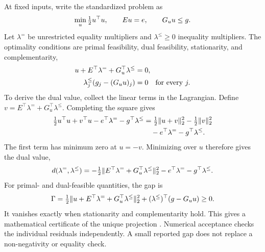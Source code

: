 At fixed inputs, write the standardized problem as
\begin{equation}
\equationname{Standardized quadratic projection with equalities and inequalities}
\min_u\tfrac12u^\top u,\qquad Eu=e,\qquad G_uu\le g.
\label{eq:plant_standard_projection}
\end{equation}
Let $\lambda^=$ be unrestricted equality multipliers and $\lambda^\le\ge0$ inequality multipliers. The optimality conditions are primal feasibility, dual feasibility, stationarity, and complementarity,
\begin{align}
\equationname{Stationarity condition for the plant quadratic projection}
u+E^\top\lambda^=+G_u^\top\lambda^\le&=0,\\
\equationname{Complementarity condition for the projection inequality multipliers}
\lambda^\le_j(g_j-(G_uu)_j)&=0\quad\text{for every }j.
\label{eq:plant_projection_optimality}
\end{align}
To derive the dual value, collect the linear terms in the Lagrangian. Define $v=E^\top\lambda^=+G_u^\top\lambda^\le$. Completing the square gives
\begin{align}
\equationname{Completed-square expansion of the projection Lagrangian}
\tfrac12u^\top u+v^\top u-e^\top\lambda^=-g^\top\lambda^\le
&=\tfrac12\|u+v\|_2^2-\tfrac12\|v\|_2^2\\
\equationname{Target terms in the completed-square projection Lagrangian}
&\quad-e^\top\lambda^=-g^\top\lambda^\le.
\end{align}
The first term has minimum zero at $u=-v$. Minimizing over $u$ therefore gives the dual value,
\begin{equation}
\equationname{Dual objective of the standardized quadratic projection}
d(\lambda^=,\lambda^\le)=
-\tfrac12\|E^\top\lambda^=+G_u^\top\lambda^\le\|_2^2
-e^\top\lambda^=-g^\top\lambda^\le.
\end{equation}
For primal- and dual-feasible quantities, the gap is
\begin{equation}
\equationname{Primal-dual gap and its non-negative decomposition}
\Gamma=\tfrac12\|u+E^\top\lambda^=+G_u^\top\lambda^\le\|_2^2
+(\lambda^\le)^\top(g-G_uu)\ge0.
\label{eq:plant_projection_gap}
\end{equation}
It vanishes exactly when stationarity and complementarity hold. This gives a mathematical certificate of the unique projection \citep{Boyd2004}. Numerical acceptance checks the individual residuals independently. A small reported gap does not replace a non-negativity or equality check.

